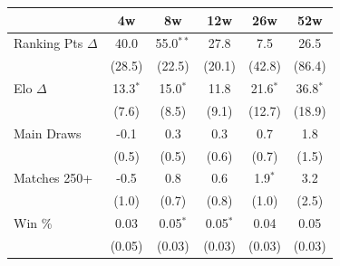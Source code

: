 \begin{tabular}{l*{5}{c}}
\toprule
 & 4w & 8w & 12w & 26w & 52w \\
\midrule
Ranking Pts $\Delta$ & 40.0 & 55.0$^{**}$ & 27.8 & 7.5 & 26.5 \\
 & (28.5) & (22.5) & (20.1) & (42.8) & (86.4) \\[0.3em]
Elo $\Delta$ & 13.3$^{*}$ & 15.0$^{*}$ & 11.8 & 21.6$^{*}$ & 36.8$^{*}$ \\
 & (7.6) & (8.5) & (9.1) & (12.7) & (18.9) \\[0.3em]
Main Draws & -0.1 & 0.3 & 0.3 & 0.7 & 1.8 \\
 & (0.5) & (0.5) & (0.6) & (0.7) & (1.5) \\[0.3em]
Matches 250+ & -0.5 & 0.8 & 0.6 & 1.9$^{*}$ & 3.2 \\
 & (1.0) & (0.7) & (0.8) & (1.0) & (2.5) \\[0.3em]
Win \% & 0.03 & 0.05$^{*}$ & 0.05$^{*}$ & 0.04 & 0.05 \\
 & (0.05) & (0.03) & (0.03) & (0.03) & (0.03) \\[0.3em]
\bottomrule
\end{tabular}
